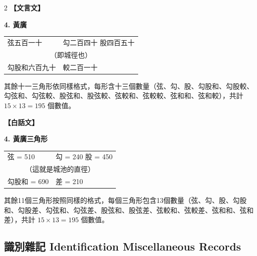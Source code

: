 \documentclass[11pt,a4paper]{article}
\begin{document}
\begin{paracol}{2}
\textbf{【文言文】}

\textbf{4. 黃廣}

\begin{center}
\begin{tabular}{ll}
弦五百一十 & 勾二百四十 \quad 股四百五十 \\
\multicolumn{2}{c}{（即城徑也）} \\
勾股和六百九十 & 較二百一十 \\
\end{tabular}
\end{center}

其餘十一三角形依同樣格式，每形含十三個數量（弦、勾、股、勾股和、勾股較、勾弦和、勾弦較、股弦和、股弦較、弦較和、弦較較、弦和和、弦和較），共計 $15 \times 13 = 195$ 個數值。

\switchcolumn
\textbf{【白話文】}

\textbf{4. 黃廣三角形}

\begin{center}
\begin{tabular}{ll}
弦 = 510 & 勾 = 240 \quad 股 = 450 \\
\multicolumn{2}{c}{（這就是城池的直徑）} \\
勾股和 = 690 & 差 = 210 \\
\end{tabular}
\end{center}

其餘11個三角形按照同樣的格式，每個三角形包含13個數量（弦、勾、股、勾股和、勾股差、勾弦和、勾弦差、股弦和、股弦差、弦較和、弦較差、弦和和、弦和差），共計 $15 \times 13 = 195$ 個數值。
\end{paracol}

\subsection{識別雜記 Identification Miscellaneous Records}
\label{subsec:identification}
\end{document}
